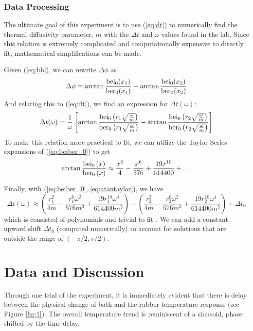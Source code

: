 \documentclass[12pt]{article}
\begin{document}
\subsubsection{Data Processing}
The ultimate goal of this experiment is to use (\ref{eq:dt}) to numerically find the thermal diffusivity parameter, $m$ with the $\Delta t$ and $\omega$ values found in the lab. Since this relation is extremely complicated and computationally expensive to directly fit, mathematical simplifications can be made.

Given (\ref{eq:bb}), we can rewrite $\Delta\phi$ as
\begin{equation}
    \Delta\phi=\arctan\frac{{\rm bei_0}(x_1)}{{\rm ber_0}(x_1)}-\arctan\frac{{\rm bei_0}(x_2)}{{\rm ber_0}(x_2)}
    \label{eq:dphi}
\end{equation}
And relating this to (\ref{eq:dt}), we find an expression for $\Delta t(\omega)$:
\begin{equation}
    \Delta t(\omega)=\frac{1}{\omega}\left[\arctan\frac{{\rm bei_0}\left(r_1\sqrt{\frac{\omega}{m}}\right)}{{\rm ber_0}\left(r_1\sqrt{\frac{\omega}{m}}\right)}-\arctan\frac{{\rm bei_0}\left(r_2\sqrt{\frac{\omega}{m}}\right)}{{\rm ber_0}\left(r_2\sqrt{\frac{\omega}{m}}\right)}\right]
    \label{eq:beiber_0}
\end{equation}
To make this relation more practical to fit, we can utilize the Taylor Series expansions of 
(\ref{eq:beiber_0}) to get
\begin{equation}
    \arctan\frac{{\rm bei_0}\left(x\right)}{{\rm ber_0}\left(x\right)}\approx\frac{x^2}{4}-\frac{x^6}{576}+\frac{19x^{10}}{614400}+\dots
    \label{eq:atantaylor}
\end{equation}

Finally, with (\ref{eq:beiber_0}, \ref{eq:atantaylor}), we have
\begin{equation}
    \Delta t(\omega)\approx\left(\frac{r_1^2}{4m}-\frac{r_1^6\omega^2}{576m^3}+\frac{19r_1^{10}\omega^4}{614400m^5}\right)-\left(\frac{r_2^2}{4m}-\frac{r_2^6\omega^2}{576m^3}+\frac{19r_2^{10}\omega^4}{614400m^5}\right) + \Delta t_0
    \label{eq:final}
\end{equation}
which is consisted of polynomials and trivial to fit \autocite{wolframalpha}. We can add a constant upward shift $\Delta t_0$ (computed numerically) to account for solutions that are outside the range of $(-\pi/2,\pi/2)$.

\section{Data and Discussion}
Through one trial of the experiment, it is immediately evident that there is delay between the physical change of bath and the rubber temperature response (see Figure \ref{fig:1}). The overall temperature trend is reminiscent of a sinusoid, phase shifted by the time delay.
\end{document}
